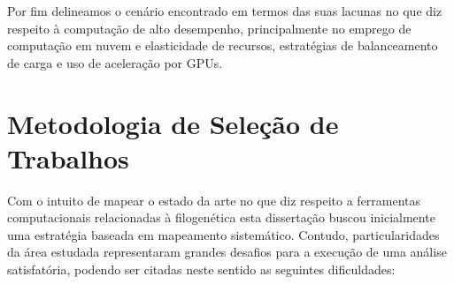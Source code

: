 \documentclass[english,brazilian]{UNISINOSmonografia} %
\begin{document}
Por fim delineamos o cenário encontrado em termos das suas lacunas no que diz respeito à computação de alto desempenho, principalmente no emprego de computação em nuvem e elasticidade de recursos, estratégias de balanceamento de carga e uso de aceleração por GPUs.


\section{Metodologia de Seleção de Trabalhos}


Com o intuito de mapear o estado da arte no que diz respeito a ferramentas computacionais relacionadas à filogenética esta dissertação buscou inicialmente uma estratégia baseada em mapeamento sistemático. Contudo, particularidades da área estudada representaram grandes desafios para a execução de uma análise satisfatória, podendo ser citadas neste sentido as seguintes dificuldades:
\end{document}
